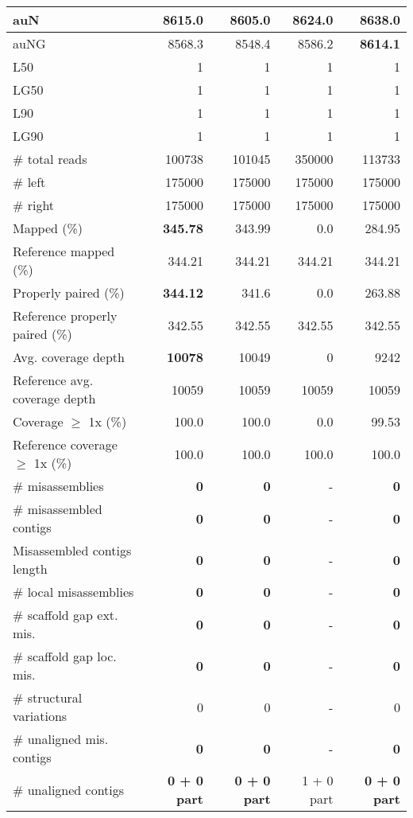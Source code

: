\documentclass[12pt,a4paper]{article}
\begin{document}
\begin{table}[ht]
\begin{center}
\begin{tabular}{|l*{4}{|r}|}
auN & 8615.0 & 8605.0 & 8624.0 & {\bf 8638.0} \\ \hline
auNG & 8568.3 & 8548.4 & 8586.2 & {\bf 8614.1} \\ \hline
L50 & 1 & 1 & 1 & 1 \\ \hline
LG50 & 1 & 1 & 1 & 1 \\ \hline
L90 & 1 & 1 & 1 & 1 \\ \hline
LG90 & 1 & 1 & 1 & 1 \\ \hline
\# total reads & 100738 & 101045 & 350000 & 113733 \\ \hline
\# left & 175000 & 175000 & 175000 & 175000 \\ \hline
\# right & 175000 & 175000 & 175000 & 175000 \\ \hline
Mapped (\%) & {\bf 345.78} & 343.99 & 0.0 & 284.95 \\ \hline
Reference mapped (\%) & 344.21 & 344.21 & 344.21 & 344.21 \\ \hline
Properly paired (\%) & {\bf 344.12} & 341.6 & 0.0 & 263.88 \\ \hline
Reference properly paired (\%) & 342.55 & 342.55 & 342.55 & 342.55 \\ \hline
Avg. coverage depth & {\bf 10078} & 10049 & 0 & 9242 \\ \hline
Reference avg. coverage depth & 10059 & 10059 & 10059 & 10059 \\ \hline
Coverage $\geq$ 1x (\%) & 100.0 & 100.0 & 0.0 & 99.53 \\ \hline
Reference coverage $\geq$ 1x (\%) & 100.0 & 100.0 & 100.0 & 100.0 \\ \hline
\# misassemblies & {\bf 0} & {\bf 0} & - & {\bf 0} \\ \hline
\# misassembled contigs & {\bf 0} & {\bf 0} & - & {\bf 0} \\ \hline
Misassembled contigs length & {\bf 0} & {\bf 0} & - & {\bf 0} \\ \hline
\# local misassemblies & {\bf 0} & {\bf 0} & - & {\bf 0} \\ \hline
\# scaffold gap ext. mis. & {\bf 0} & {\bf 0} & - & {\bf 0} \\ \hline
\# scaffold gap loc. mis. & {\bf 0} & {\bf 0} & - & {\bf 0} \\ \hline
\# structural variations & 0 & 0 & - & 0 \\ \hline
\# unaligned mis. contigs & {\bf 0} & {\bf 0} & - & {\bf 0} \\ \hline
\# unaligned contigs & {\bf 0 + 0 part} & {\bf 0 + 0 part} & 1 + 0 part & {\bf 0 + 0 part} \\ \hline

\end{tabular}
\end{center}
\end{table}
\end{document}

